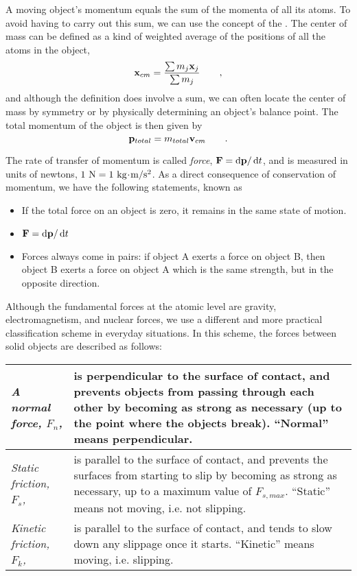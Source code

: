 	A moving object's momentum equals the sum of the momenta of all its atoms.
	To avoid having to carry out this sum, we can use the concept of the . The center of mass can be defined as a kind of weighted
	average of the positions of all the atoms in the object,
	\begin{equation*}
		\mathbf{x}_{cm} = \frac{\sum m_j\mathbf{x}_j}{\sum m_j} \qquad ,
	\end{equation*}
	and although the definition does involve a sum, we can often locate the center of
	mass by symmetry or by physically determining an object's balance point.
	The total momentum of the object is then given by
	\begin{equation*}
		\mathbf{p}_{total} = m_{total}\mathbf{v}_{cm} \qquad .
	\end{equation*}
	
	The rate of transfer of momentum is called \emph{force}, $\mathbf{F}=\operatorname{d\!} \mathbf{p}/\operatorname{d\!} t$, and
	is measured in units of newtons, $1\ \nunit=1\ \kgunit\unitdot\munit/\sunit^2$.
	As a direct consequence of conservation of momentum, we have the following
	statements, known as 
	\begin{itemize}
		\item[] If the total force on an object is
			zero, it remains in the same state of motion.
		\item[] $\mathbf{F}=\operatorname{d\!} \mathbf{p}/\operatorname{d\!} t$
		\item[] Forces always come in pairs: if object A exerts a force on object B,
			then object B exerts a force on object A which is the same strength, but
			in the opposite direction.
	\end{itemize}
	
	Although the fundamental forces at the atomic level are gravity, electromagnetism,
	and nuclear forces, we use a different and more practical classification scheme in
	everyday situations. In this scheme, the forces between solid objects are
	described as follows:\\
		\noindent\begin{tabular}{|lp{90mm}|}
		\hline
		\emph{A normal force, $F_n$,} 
			& is perpendicular to the surface of contact, and prevents objects
				from passing through each other by becoming as strong
				as necessary (up to the point where the objects break).
				``Normal'' means perpendicular. \\
		\hline
		\emph{Static friction, $F_s$,} 
			& is parallel to the surface of contact, and prevents the surfaces from
				starting to slip by becoming as strong as necessary, up
				to a maximum value of $F_{s,max}$. 
				``Static'' means not moving, i.e. not slipping.\\
		\hline
		\emph{Kinetic friction, $F_k$,} 
			& is parallel to the surface of contact, and tends to slow down
				any slippage once it starts.
				``Kinetic'' means moving, i.e. slipping. \\
		\hline
	\end{tabular}
	
